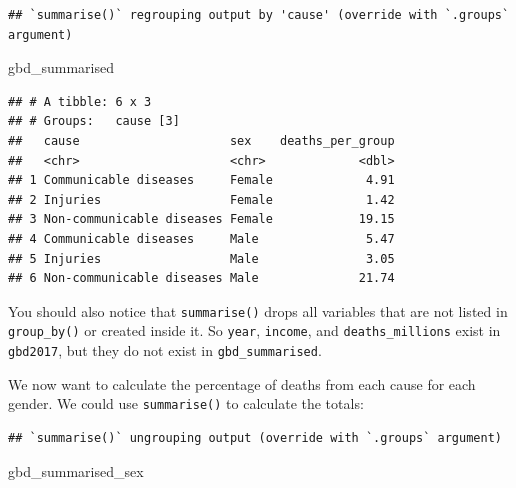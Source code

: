 \documentclass[
  12pt,
  krantz2]{krantz}
\makeatletter
\newenvironment{Shaded}{\begin{snugshade}}{\end{snugshade}}
\newcommand{\DataTypeTok}[1]{\textcolor[rgb]{0.13,0.29,0.53}{#1}}
\newcommand{\KeywordTok}[1]{\textcolor[rgb]{0.13,0.29,0.53}{\textbf{#1}}}
\newcommand{\NormalTok}[1]{#1}
\newcommand{\OperatorTok}[1]{\textcolor[rgb]{0.81,0.36,0.00}{\textbf{#1}}}
\newcommand{\StringTok}[1]{\textcolor[rgb]{0.31,0.60,0.02}{#1}}
\newenvironment{kframe}{%
\medskip{}
\setlength{\fboxsep}{.8em}
 \def\at@end@of@kframe{}%
 \ifinner\ifhmode%
  \def\at@end@of@kframe{\end{minipage}}%
  \begin{minipage}{\columnwidth}%
 \fi\fi%
 \def\FrameCommand##1{\hskip\@totalleftmargin \hskip-\fboxsep
 \colorbox{shadecolor}{##1}\hskip-\fboxsep
     \hskip-\linewidth \hskip-\@totalleftmargin \hskip\columnwidth}%
 \MakeFramed {\advance\hsize-\width
   \@totalleftmargin\z@ \linewidth\hsize
   \@setminipage}}%
 {\par\unskip\endMakeFramed%
 \at@end@of@kframe}
\renewenvironment{Shaded}{\begin{kframe}}{\end{kframe}}
\makeatother
\begin{document}
\begin{verbatim}
## `summarise()` regrouping output by 'cause' (override with `.groups` argument)
\end{verbatim}

\begin{Shaded}
\begin{Highlighting}[]
\NormalTok{gbd_summarised}
\end{Highlighting}
\end{Shaded}

\begin{verbatim}
## # A tibble: 6 x 3
## # Groups:   cause [3]
##   cause                     sex    deaths_per_group
##   <chr>                     <chr>             <dbl>
## 1 Communicable diseases     Female             4.91
## 2 Injuries                  Female             1.42
## 3 Non-communicable diseases Female            19.15
## 4 Communicable diseases     Male               5.47
## 5 Injuries                  Male               3.05
## 6 Non-communicable diseases Male              21.74
\end{verbatim}

You should also notice that \texttt{summarise()} drops all variables that are not listed in \texttt{group\_by()} or created inside it.
So \texttt{year}, \texttt{income}, and \texttt{deaths\_millions} exist in \texttt{gbd2017}, but they do not exist in \texttt{gbd\_summarised}.

We now want to calculate the percentage of deaths from each cause for each gender.
We could use \texttt{summarise()} to calculate the totals:

\begin{Shaded}
\end{Shaded}

\begin{verbatim}
## `summarise()` ungrouping output (override with `.groups` argument)
\end{verbatim}

\begin{Shaded}
\begin{Highlighting}[]
\NormalTok{gbd_summarised_sex}
\end{Highlighting}
\end{Shaded}
\end{document}
